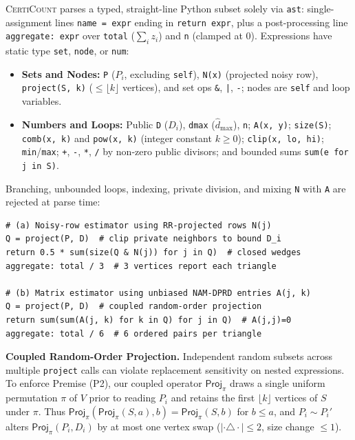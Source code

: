 \documentclass[conference]{IEEEtran}
\newlength{\ieeeindent}
\newcommand{\parhead}[1]{\par\noindent\hspace*{\ieeeindent}\textbf{#1}}
\theoremstyle{ieeeitalic}
\newcommand{\dhatmax}{\hat{d}_{\max}}
\newcommand{\Proj}{\mathsf{Proj}}
\begin{document}
\textsc{CertiCount} parses a typed, straight-line Python subset solely via \texttt{ast}: single-assignment lines \texttt{name = expr} ending in \texttt{return expr}, plus a post-processing line \texttt{aggregate: expr} over \texttt{total} ($\sum_i z_i$) and \texttt{n} (clamped at $0$). Expressions have static type \texttt{set}, \texttt{node}, or \texttt{num}:
\begin{itemize}
    \item \textbf{Sets and Nodes:} \texttt{P} ($P_i$, excluding \texttt{self}), \texttt{N(x)} (projected noisy row), \texttt{project(S, k)} ($\le \lfloor k \rfloor$ vertices), and set ops \texttt{\&}, \texttt{|}, \texttt{-}; nodes are \texttt{self} and loop variables.
    \item \textbf{Numbers and Loops:} Public \texttt{D} ($D_i$), \texttt{dmax} ($\dhatmax$), \texttt{n}; \texttt{A(x, y)}; \texttt{size(S)}; \texttt{comb(x, k)} and \texttt{pow(x, k)} (integer constant $k \ge 0$); \texttt{clip(x, lo, hi)}; \texttt{min}/\texttt{max}; \texttt{+}, \texttt{-}, \texttt{*}, \texttt{/} by non-zero public divisors; and bounded sums \texttt{sum(e for j in S)}.
\end{itemize}
Branching, unbounded loops, indexing, private division, and mixing \texttt{N} with \texttt{A} are rejected at parse time:
\begin{lstlisting}[style=dslstyle]
# (a) Noisy-row estimator using RR-projected rows N(j)
Q = project(P, D)  # clip private neighbors to bound D_i
return 0.5 * sum(size(Q & N(j)) for j in Q)  # closed wedges
aggregate: total / 3  # 3 vertices report each triangle

# (b) Matrix estimator using unbiased NAM-DPRD entries A(j, k)
Q = project(P, D)  # coupled random-order projection
return sum(sum(A(j, k) for k in Q) for j in Q)  # A(j,j)=0
aggregate: total / 6  # 6 ordered pairs per triangle
\end{lstlisting}

\parhead{Coupled Random-Order Projection.}
Independent random subsets across multiple \texttt{project} calls can violate replacement sensitivity on nested expressions. To enforce Premise (P2), our coupled operator $\Proj_\pi$ draws a single uniform permutation $\pi$ of $V$ prior to reading $P_i$ and retains the first $\lfloor k \rfloor$ vertices of $S$ under $\pi$. Thus $\Proj_\pi(\Proj_\pi(S, a), b) = \Proj_\pi(S, b)$ for $b \le a$, and $P_i \sim P_i'$ alters $\Proj_\pi(P_i, D_i)$ by at most one vertex swap ($|\cdot \triangle \cdot| \le 2$, size change $\le 1$).
\end{document}
